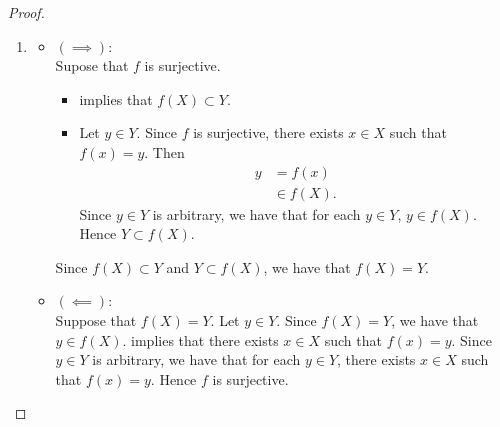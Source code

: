 \documentclass{book}
\begin{document}
\begin{proof}
\begin{enumerate}
\begin{itemize}
				\begin{align*}
					f(x_1)
					& = y \\
					& \in \{y\},
				\end{align*}
				we have that $x_1 \in f^{-1}(\{y\})$. Therefore 
				\begin{align*}
					x_1 
					& \in f^{-1}(\{y\}) \\
					& = \{x\}.
				\end{align*}
				Similarly, $x_2 \in \{x\}$. \rex{}  then implies that 
				\begin{align*}
					x_1
					& = x \\
					& = x_1.
				\end{align*}
				Since $x_1, x_2 \in X$ with $f(x_1) = f(x_2)$ are arbitrary, we have that for each $x_1, x_2 \in X$, $f(x_1) = f(x_2)$ implies that $x_1 = x_2$. Thus $f$ is injective. 
			\end{itemize}
			\item 
			\begin{itemize}
				\item $(\implies)$: \\
				Supose that $f$ is surjective. 
				\begin{itemize}
					\item \rd{}  implies that $f(X) \subset Y$. 
					\item Let $y \in Y$. Since $f$ is surjective, there exists $x \in X$ such that $f(x) = y$. Then 
					\begin{align*}
						y
						& = f(x) \\
						& \in f(X).
					\end{align*}
					Since $y \in Y$ is arbitrary, we have that for each $y \in Y$, $y \in f(X)$. Hence $Y \subset f(X)$. 
				\end{itemize}
				Since $f(X) \subset Y$ and $Y \subset f(X)$, we have that $f(X) = Y$.
				\item $(\impliedby)$: \\
				Suppose that $f(X) = Y$. Let $y \in Y$. Since $f(X) = Y$, we have that $y \in f(X)$. \rd{}  implies that there exists $x \in X$ such that $f(x) = y$. Since $y \in Y$ is arbitrary, we have that for each $y \in Y$, there exists $x \in X$ such that $f(x) = y$. Hence $f$ is surjective.
			\end{itemize}
		\end{enumerate}
	\end{proof}
	
	
	
\end{document}
